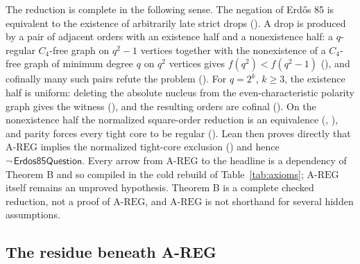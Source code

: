 \documentclass{anvil-paper}
\newcommand{\AREG}{\mathrm{A\text{-}REG}}
\newcommand{\Qn}{\textsf{Erdos85Question}}
\theoremstyle{definition}
\begin{document}
The reduction is complete in the following sense. The negation of Erdős 85 is equivalent to the existence of arbitrarily late strict drops (). A drop is produced by a pair of adjacent orders with an existence half and a nonexistence half: a $q$-regular $C_4$-free graph on $q^2-1$ vertices together with the nonexistence of a $C_4$-free graph of minimum degree $q$ on $q^2$ vertices gives $f(q^2)<f(q^2-1)$ (), and cofinally many such pairs refute the problem (). For $q=2^k$, $k\ge 3$, the existence half is uniform: deleting the absolute nucleus from the even-characteristic polarity graph gives the witness (), and the resulting orders are cofinal (). On the nonexistence half the normalized square-order reduction is an equivalence (, ), and parity forces every tight core to be regular (). Lean then proves directly that $\AREG$ implies the normalized tight-core exclusion () and hence $\neg\,\Qn$. Every arrow from $\AREG$ to the headline is a dependency of Theorem B and so compiled in the cold rebuild of Table~\ref{tab:axioms}; $\AREG$ itself remains an unproved hypothesis. Theorem B is a complete checked reduction, not a proof of $\AREG$, and $\AREG$ is not shorthand for several hidden assumptions.

\subsection{The residue beneath A-REG}\label{sec:residue}
\end{document}
